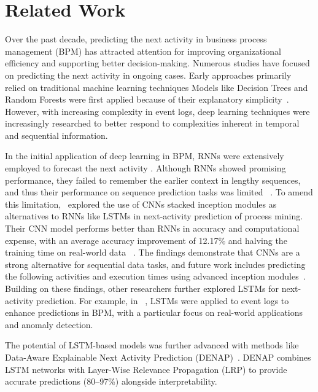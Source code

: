 \section{Related Work}
Over the past decade, predicting the next activity in business process management (BPM) has attracted attention for improving organizational efficiency and supporting better decision-making. Numerous studies have focused on predicting the next activity in ongoing cases. Early approaches primarily relied on traditional machine learning techniques Models like Decision Trees and Random Forests were first applied because of their explanatory simplicity~\citep{breiman2001random, song2015decision}. However, with increasing complexity in event logs, deep learning techniques were increasingly researched to better respond to complexities inherent in temporal and sequential information.

In the initial application of deep learning in BPM, RNNs were extensively employed to forecast the next activity \citep{abbasi2024review}. Although RNNs showed promising performance, they failed to remember the earlier context in lengthy
sequences, and thus their performance on sequence prediction tasks was limited ~\citep{wang2023mitfm}. To amend this limitation,~\cite{di2019activity} explored the use of CNNs stacked inception modules as alternatives to RNNs like LSTMs in next-activity prediction of process mining. Their CNN model performs better than RNNs in accuracy and computational expense, with an average accuracy improvement of 12.17\% and halving the training time on real-world data ~\citep{di2019activity}. The findings demonstrate that CNNs are a strong alternative for sequential data tasks, and future work includes predicting the following activities and execution times using advanced inception modules~\citep{di2019activity}. Building on these findings, other researchers further explored LSTMs for next-activity prediction. For example, in ~\citep{musa2023prediction}, LSTMs were applied to event logs to enhance predictions in BPM, with a particular focus on real-world applications and anomaly detection. 

The potential of LSTM-based models was further advanced with methods like Data-Aware Explainable Next Activity Prediction (DENAP)~\citep{aversano2023data}. DENAP combines LSTM networks with Layer-Wise Relevance Propagation (LRP) to provide accurate predictions (80–97\%) alongside interpretability.

